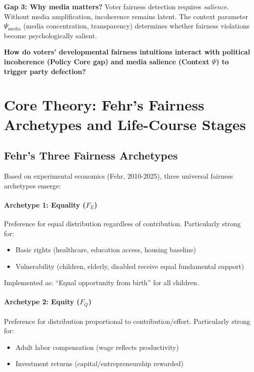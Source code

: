 \textbf{Gap 3: Why media matters?}
Voter fairness detection requires \textit{salience}. Without media amplification, incoherence remains
latent. The context parameter $\Psi_{\text{media}}$ (media concentration, transparency) determines
whether fairness violations become psychologically salient.

\begin{tcolorbox}[colback=red!5!white, colframe=red!75!black,
    title=The Fundamental Question]
\textbf{How do voters' developmental fairness intuitions interact with political incoherence
(Policy Core gap) and media salience (Context $\Psi$) to trigger party defection?}
\end{tcolorbox}

\section{Core Theory: Fehr's Fairness Archetypes and Life-Course Stages}
\label{sec:cm-theory}

\subsection{Fehr's Three Fairness Archetypes}

Based on experimental economics (Fehr, 2010-2025), three universal fairness archetypes emerge:

\paragraph{Archetype 1: Equality ($F_E$)}
Preference for equal distribution regardless of contribution. Particularly strong for:
\begin{itemize}[nosep]
\item Basic rights (healthcare, education access, housing baseline)
\item Vulnerability (children, elderly, disabled receive equal fundamental support)
\end{itemize}

Implemented as: ``Equal opportunity from birth'' for all children.

\paragraph{Archetype 2: Equity ($F_Q$)}
Preference for distribution proportional to contribution/effort. Particularly strong for:
\begin{itemize}[nosep]
\item Adult labor compensation (wage reflects productivity)
\item Investment returns (capital/entrepreneurship rewarded)
\end{itemize}

